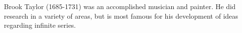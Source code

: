 \begin{frame}
Brook Taylor (1685-1731) was an accomplished musician and painter.  He did research in a variety of areas, but is most famous for his development of ideas regarding infinite series.

\begin{center}
\end{center}


\end{frame}
